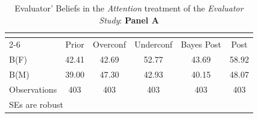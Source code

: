 \begin{table}[htbp]\centering
\caption{Evaluator’ Beliefs in the \textit{Attention} treatment of the \textit{Evaluator Study}: \textbf{Panel A}}
\begin{tabular}{l*{5}{c}}
\hline\hline
                &\multicolumn{5}{c}{}                             \\\cmidrule(lr){2-6}
                &\multicolumn{1}{c}{Prior}&\multicolumn{1}{c}{Overconf}&\multicolumn{1}{c}{Underconf}&\multicolumn{1}{c}{Bayes Post}&\multicolumn{1}{c}{Post}\\
\hline
B(F)            &    42.41&    42.69&    52.77&    43.69&    58.92\\
B(M)            &    39.00&    47.30&    42.93&    40.15&    48.07\\
\hline
Observations    &      403&      403&      403&      403&      403\\
\hline\hline
\multicolumn{6}{l}{\footnotesize SEs are robust}\\
\end{tabular}
\end{table}
